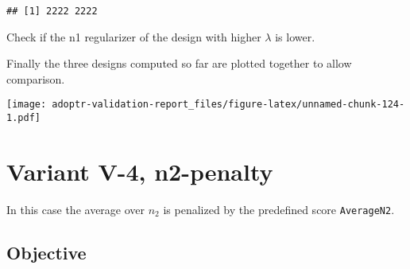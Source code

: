 \documentclass[]{book}
\newenvironment{Shaded}{\begin{snugshade}}{\end{snugshade}}
\newcommand{\DecValTok}[1]{\textcolor[rgb]{0.00,0.00,0.81}{#1}}
\newcommand{\KeywordTok}[1]{\textcolor[rgb]{0.13,0.29,0.53}{\textbf{#1}}}
\newcommand{\NormalTok}[1]{#1}
\newcommand{\OperatorTok}[1]{\textcolor[rgb]{0.81,0.36,0.00}{\textbf{#1}}}
\newcommand{\StringTok}[1]{\textcolor[rgb]{0.31,0.60,0.02}{#1}}
\begin{document}
\begin{verbatim}
## [1] 2222 2222
\end{verbatim}

\begin{Shaded}
\end{Shaded}

Check if the n1 regularizer of the design with higher \(\lambda\) is lower.

\begin{Shaded}
\end{Shaded}

Finally the three designs computed so far are plotted together to allow
comparison.

\texttt{[image: adoptr-validation-report\_files/figure-latex/unnamed-chunk-124-1.pdf]}

\hypertarget{variantV_4}{%
\section{Variant V-4, n2-penalty}\label{variantV_4}}

In this case the average over \(n_2\) is penalized by the predefined score
\texttt{AverageN2}.

\hypertarget{objective-13}{%
\subsection{Objective}\label{objective-13}}
\end{document}
